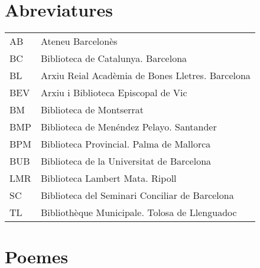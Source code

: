 \section*{Abreviatures}

\begin{center}
  \begin{longtable}{l l}
    AB & \hspace{2em} Ateneu Barcelonès \\
    BC & \hspace{2em} Biblioteca de Catalunya. Barcelona \\
    BL & \hspace{2em} Arxiu Reial Acadèmia de Bones Lletres. Barcelona \\
    BEV & \hspace{2em} Arxiu i Biblioteca Episcopal de Vic \\
    BM & \hspace{2em} Biblioteca de Montserrat \\
    BMP & \hspace{2em} Biblioteca de Menéndez Pelayo. Santander \\
    BPM & \hspace{2em} Biblioteca Provincial. Palma de Mallorca \\
    BUB & \hspace{2em} Biblioteca de la Universitat de Barcelona \\
    LMR & \hspace{2em} Biblioteca Lambert Mata. Ripoll \\
    SC & \hspace{2em} Biblioteca del Seminari Conciliar de Barcelona \\
    TL & \hspace{2em} Bibliothèque Municipale. Tolosa de Llenguadoc \\
  \end{longtable}
\end{center}

\section*{Poemes}

